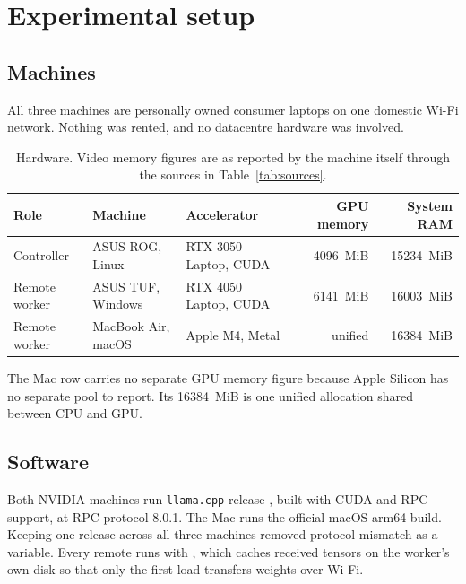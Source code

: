 \section{Experimental setup}
\label{sec:setup}

\subsection{Machines}

All three machines are personally owned consumer laptops on one domestic Wi-Fi
network. Nothing was rented, and no datacentre hardware was involved.

\begin{table}[htbp]
\centering\small
\caption{Hardware. Video memory figures are as reported by the machine itself
through the sources in Table~\ref{tab:sources}.}
\label{tab:hardware}
\begin{tabular}{@{}lllrr@{}}
\toprule
\textbf{Role} & \textbf{Machine} & \textbf{Accelerator} & \textbf{GPU memory} & \textbf{System RAM} \\
\midrule
Controller      & ASUS ROG, Linux   & RTX 3050 Laptop, CUDA & \SI{4096}{MiB} & \SI{15234}{MiB} \\
Remote worker   & ASUS TUF, Windows & RTX 4050 Laptop, CUDA & \SI{6141}{MiB} & \SI{16003}{MiB} \\
Remote worker   & MacBook Air, macOS & Apple M4, Metal      & unified        & \SI{16384}{MiB} \\
\bottomrule
\end{tabular}
\end{table}

The Mac row carries no separate GPU memory figure because Apple Silicon has no
separate pool to report. Its \SI{16384}{MiB} is one unified allocation shared
between CPU and GPU.

\subsection{Software}

Both NVIDIA machines run \texttt{llama.cpp} release , built with
CUDA and RPC support, at RPC protocol 8.0.1. The Mac runs the official
 macOS arm64 build. Keeping one release across all three machines
removed protocol mismatch as a variable. Every remote
 runs with , which caches received tensors on the
worker's own disk so that only the first load transfers weights over Wi-Fi.

